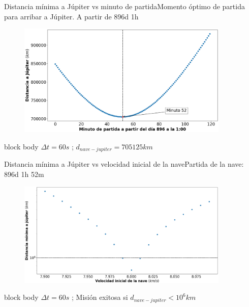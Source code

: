 \documentclass{beamer}
\begin{document}
            \begin{frame}{Distancia mínima a Júpiter vs minuto de partida}{Momento óptimo de partida para arribar a Júpiter. A partir de 896d 1h}
                \begin{figure}[H!]
                    \includegraphics[width=0.9\textwidth]{./distancia_a_jupiter_vs_minuto_de_partida}
                    \label{fig:jupiter_5}
                \end{figure}
                \begin{beamercolorbox}[sep=5pt,center]{block body}
                    \centering
                    \small{$\Delta t = 60s$ ; $d_{nave-jupiter} = 705125 km$}
                \end{beamercolorbox}
            \end{frame}

            \begin{frame}{Distancia mínima a Júpiter vs velocidad inicial de la nave}{Partida de la nave: 896d 1h 52m}
                \begin{figure}[H!]
                    \includegraphics[width=0.9\textwidth]{./min_distance_vs_v0_logarithmic_jupiter}
                    \label{fig:jupiter_6}
                \end{figure}
                \begin{beamercolorbox}[sep=5pt,center]{block body}
                    \centering
                    \small{$\Delta t = 60s$ ; Misión exitosa si $d_{nave-jupiter} < 10^6 km$}
                \end{beamercolorbox}
            \end{frame}
\end{document}
